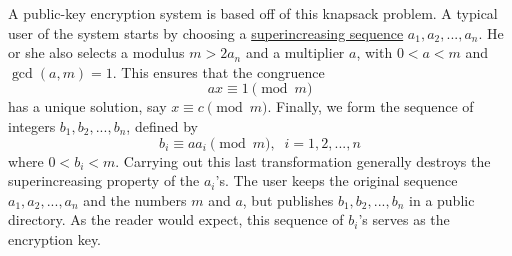 \documentclass{article}
\begin{document}
A public-key encryption system is based off of this knapsack problem. A typical user of the system starts by choosing a \hyperref[def:superincreasing-sequence]{superincreasing sequence} $a_1, a_2, ..., a_n$. He or she also selects a modulus $m > 2a_n$ and a multiplier $a$, with $0 < a < m$ and $\gcd(a, m) = 1$. This ensures that the congruence 
\begin{equation}
  ax \equiv 1 \pmod{m}
\end{equation}
has a unique solution, say $x \equiv c \pmod{m}$. Finally, we form the sequence of integers $b_1, b_2, ..., b_n$, defined by 
\begin{equation}
  b_i \equiv a a_i \pmod{m}, \;\; i = 1, 2, ..., n
\end{equation}
where $0 < b_i < m$. Carrying out this last transformation generally destroys the superincreasing property of the $a_i$'s. The user keeps the original sequence $a_1, a_2, ..., a_n$ and the numbers $m$ and $a$, but publishes $b_1, b_2, ..., b_n$ in a public directory. As the reader would expect, this sequence of $b_i$'s serves as the encryption key. 
\end{document}

